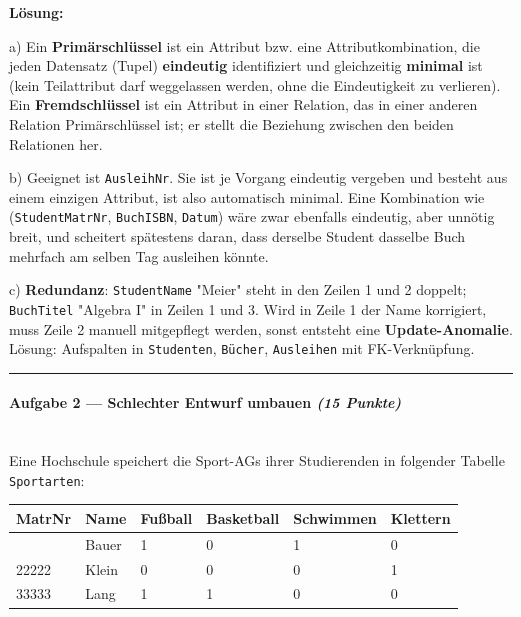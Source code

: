 \documentclass[11pt, a4paper]{article}
\begin{document}
\textbf{Lösung:}


a) Ein \textbf{Primärschlüssel} ist ein Attribut bzw. eine Attributkombination, die jeden Datensatz (Tupel) \textbf{eindeutig} identifiziert und gleichzeitig \textbf{minimal} ist (kein Teilattribut darf weggelassen werden, ohne die Eindeutigkeit zu verlieren). Ein \textbf{Fremdschlüssel} ist ein Attribut in einer Relation, das in einer anderen Relation Primärschlüssel ist; er stellt die Beziehung zwischen den beiden Relationen her.


b) Geeignet ist \texttt{AusleihNr}. Sie ist je Vorgang eindeutig vergeben und besteht aus einem einzigen Attribut, ist also automatisch minimal. Eine Kombination wie (\texttt{StudentMatrNr}, \texttt{BuchISBN}, \texttt{Datum}) wäre zwar ebenfalls eindeutig, aber unnötig breit, und scheitert spätestens daran, dass derselbe Student dasselbe Buch mehrfach am selben Tag ausleihen könnte.


c) \textbf{Redundanz}: \texttt{StudentName} "Meier" steht in den Zeilen 1 und 2 doppelt; \texttt{BuchTitel} "Algebra I" in Zeilen 1 und 3. Wird in Zeile 1 der Name korrigiert, muss Zeile 2 manuell mitgepflegt werden, sonst entsteht eine \textbf{Update-Anomalie}. Lösung: Aufspalten in \texttt{Studenten}, \texttt{Bücher}, \texttt{Ausleihen} mit FK-Verknüpfung.



\noindent\textcolor{rulegray}{\rule{\linewidth}{0.4pt}}


\paragraph{Aufgabe 2 — Schlechter Entwurf umbauen \textit{(15 Punkte)}}\mbox{}\\[2pt]

Eine Hochschule speichert die Sport-AGs ihrer Studierenden in folgender Tabelle \texttt{Sportarten}:



{\small
\begin{tabularx}{\linewidth}{XXXXXX}
\hline
\rowcolor{tableheadbg}
{\color{white}\textbf{MatrNr}} & {\color{white}\textbf{Name}} & {\color{white}\textbf{Fußball}} & {\color{white}\textbf{Basketball}} & {\color{white}\textbf{Schwimmen}} & {\color{white}\textbf{Klettern}} \\[2pt]
\hline
\endhead
\hline
\endfoot
11111 & Bauer & 1 & 0 & 1 & 0 \\
22222 & Klein & 0 & 0 & 0 & 1 \\
33333 & Lang & 1 & 1 & 0 & 0 \\
\end{tabularx}
}
\end{document}
